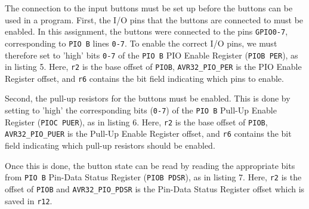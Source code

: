 The connection to the input buttons must be set up before the buttons can be used in a program.
First, the I/O pins that the buttons are connected to must be enabled.
In this assignment, the buttons were connected to the pins \texttt{GPIO0-7}, corresponding to \texttt{PIO B} lines \texttt{0-7}.
To enable the correct I/O pins, we must therefore set to 'high' bits \texttt{0-7} of the \texttt{PIO B} PIO Enable Register (\texttt{PIOB PER}), as in listing 5.
Here, \texttt{r2} is the base offset of \texttt{PIOB}, \texttt{AVR32\_PIO\_PER} is the PIO Enable Register offset, and \texttt{r6} contains the bit field indicating which pins to enable.


Second, the pull-up resistors for the buttons must be enabled.
This is done by setting to 'high' the corresponding bits (\texttt{0-7}) of the \texttt{PIO B} Pull-Up Enable Register (\texttt{PIOC PUER}), as in listing 6.
Here, \texttt{r2} is the base offset of \texttt{PIOB}, \texttt{AVR32\_PIO\_PUER} is the Pull-Up Enable Register offset, and \texttt{r6} contains the bit field indicating which pull-up resistors should be enabled.


Once this is done, the button state can be read by reading the appropriate bits from \texttt{PIO B} Pin-Data Status Register (\texttt{PIOB PDSR}), as in listing 7.
Here, \texttt{r2} is the offset of \texttt{PIOB} and \texttt{AVR32\_PIO\_PDSR} is the Pin-Data Status Register offset which is saved in \texttt{r12}.


